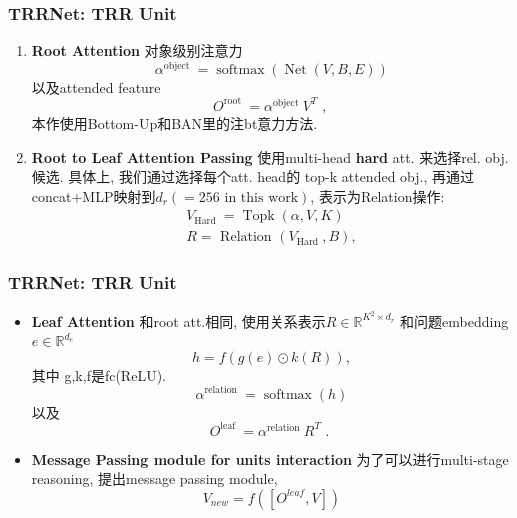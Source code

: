 \documentclass{beamer}
\newcommand{\bt}[1]{\textbf{#1}}
\begin{document}
\begin{frame}
    \frametitle{TRRNet: TRR Unit}

    \begin{enumerate}
        \item \bt{Root Attention} 对象级别注意力
        \begin{equation}
            \alpha^{\text {object }}=\operatorname{softmax}(\operatorname{Net}(V, B, E))
        \end{equation}
        以及attended feature
        \begin{equation}
            O^{\text {root }}=\alpha^{\text {object }} V^{T} \text { , }
        \end{equation}
        本作使用Bottom-Up和BAN里的注bt意力方法.
        \item \bt{Root to Leaf Attention Passing} 使用multi-head \bt{hard} att. 来选择rel. obj.候选.
        具体上, 我们通过选择每个att. head的 top-k attended obj., 再通过concat+MLP映射到$d_r(=256\text{ in this work})$, 表示为Relation操作:
        \begin{equation}
            \begin{array}{l}
            V_{\text {Hard }}=\operatorname{Topk}(\alpha, V, K) \\
            R=\text { Relation }\left(V_{\text {Hard }}, B\right),
            \end{array}
        \end{equation}
    \end{enumerate}

\end{frame}

\begin{frame}
    \frametitle{TRRNet: TRR Unit}

    \begin{itemize}
        \item \bt{Leaf Attention} 和root att.相同, 使用关系表示$R \in \mathbb{R}^{K^{2} \times d_{r}}$
        和问题embedding $e \in \mathbb{R}^{d_{e}}$
        \begin{equation}
            h=f(g(e) \odot k(R)),
        \end{equation}
        其中 g,k,f是fc(ReLU).
        \begin{equation}
            \alpha^{\text {relation }}=\operatorname{softmax}(h)
        \end{equation}
        以及
        \begin{equation}
            O^{\text {leaf }}=\alpha^{\text {relation }} R^{T} \text { . }
        \end{equation}
        \item \bt{Message Passing module for units interaction} 为了可以进行multi-stage reasoning, 提出message passing module, 
        \begin{equation}
            V_{n e w}=f\left(\left[O^{l e a f}, V\right]\right)
        \end{equation}
    \end{itemize}    
\end{frame}
\end{document}
